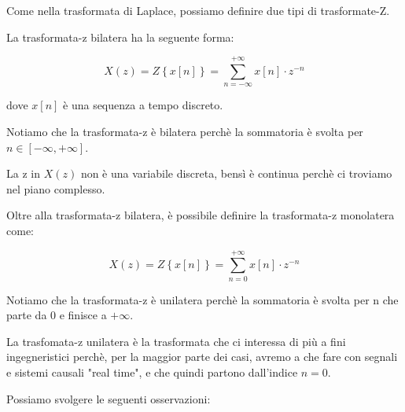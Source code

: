 \newpage 

Come nella trasformata di Laplace, possiamo definire due tipi di trasformate-Z. \newline 

La trasformata-z bilatera ha la seguente forma: 

{
    \Large 
    \begin{equation}
        X \left(z\right)
        = 
        Z \left\{ 
            x \left[ n\right]
        \right\}
        = 
        \sum_{n = -\infty}^{+ \infty}
        x \left[ n\right]
        \cdot 
        z^{-n}
    \end{equation}
}

dove $x \left[ n\right]$ è una sequenza a tempo discreto. \newline 

Notiamo che la trasformata-z è bilatera perchè la sommatoria è svolta per $n \in \left[ - \infty, + \infty\right]$. \newline 

\begin{tcolorbox}
    La z in $X\left(z\right)$ non è una variabile discreta, bensì è continua perchè ci troviamo nel piano complesso. 
\end{tcolorbox}

Oltre alla trasformata-z bilatera, è possibile definire la trasformata-z monolatera come: 

{
    \Large 
    \begin{equation}
        X \left(z\right)
        = 
        Z \left\{ 
            x \left[ n\right]
        \right\}
        = 
        \sum_{n = 0}^{+ \infty}
        x \left[ n\right]
        \cdot 
        z^{-n}
    \end{equation}
}

Notiamo che la trasformata-z è unilatera perchè la sommatoria è svolta per n che parte da 0 e finisce a $+\infty$. \newline 

\begin{tcolorbox}
    La trasfomata-z unilatera è la trasformata che ci interessa di più a fini ingegneristici perchè, per la maggior parte dei casi, 
    avremo a che fare con segnali e sistemi causali "real time", e che quindi partono dall'indice $n = 0$. 
\end{tcolorbox}

Possiamo svolgere le seguenti osservazioni: 

